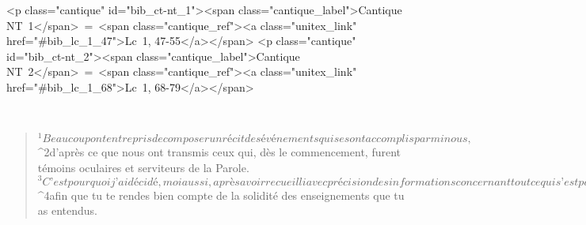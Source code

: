   
  
    
      <p class="cantique" id="bib_ct-nt_1"><span class="cantique_label">Cantique NT 1</span> = <span class="cantique_ref"><a class="unitex_link" href="#bib_lc_1_47">Lc 1, 47-55</a></span>
      <p class="cantique" id="bib_ct-nt_2"><span class="cantique_label">Cantique NT 2</span> = <span class="cantique_ref"><a class="unitex_link" href="#bib_lc_1_68">Lc 1, 68-79</a></span>
      
         
      \bchapter{}
      \begin{verse}
${}^{1}Beaucoup ont entrepris de composer un récit des événements qui se sont accomplis parmi nous, 
${}^{2}d’après ce que nous ont transmis ceux qui, dès le commencement, furent témoins oculaires et serviteurs de la Parole. 
${}^{3}C’est pourquoi j’ai décidé, moi aussi, après avoir recueilli avec précision des informations concernant tout ce qui s’est passé depuis le début, d’écrire pour toi, excellent Théophile, un exposé suivi, 
${}^{4}afin que tu te rendes bien compte de la solidité des enseignements que tu as entendus.
      

\end{verse}
